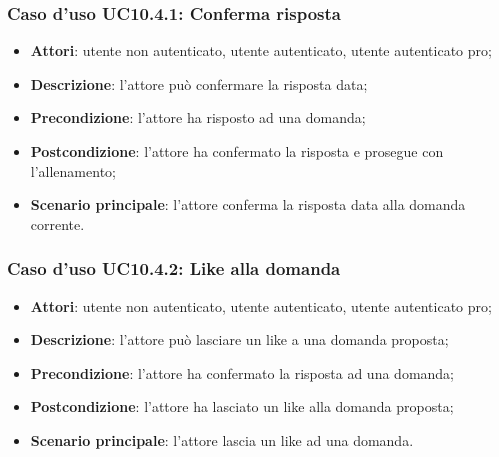 \subsubsection{Caso d'uso UC10.4.1: Conferma risposta}
	\begin{itemize}
		\item \textbf{Attori}: utente non autenticato, utente autenticato, utente autenticato pro;
		\item \textbf{Descrizione}: l'attore può confermare la risposta data;
		\item \textbf{Precondizione}: l'attore ha risposto ad una domanda;
		\item \textbf{Postcondizione}: l'attore ha confermato la risposta e prosegue con l'allenamento;
		\item \textbf{Scenario principale}: l'attore conferma la risposta data alla domanda corrente.
	\end{itemize}
	
\subsubsection{Caso d'uso UC10.4.2: Like alla domanda}
	\begin{itemize}
		\item \textbf{Attori}: utente non autenticato, utente autenticato, utente autenticato pro;
		\item \textbf{Descrizione}: l'attore può lasciare un like a una domanda proposta;
		\item \textbf{Precondizione}: l'attore ha confermato la risposta ad una domanda;
		\item \textbf{Postcondizione}: l'attore ha lasciato un like alla domanda proposta;
		\item \textbf{Scenario principale}: l'attore lascia un like ad una domanda.
	\end{itemize}
	
